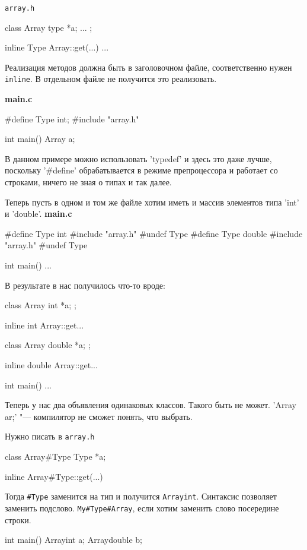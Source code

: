 \verb'array.h'
\begin{cppcode}
class Array {
    type *a;
    ...
};

inline Type Array::get(...) {  
    ...
}
\end{cppcode}

Реализация методов должна быть в заголовочном файле, соответственно нужен \verb'inline'. В отдельном файле не получится это реализовать.

\textbf{main.c}
\begin{cppcode}
#define Type int;
#include "array.h"

int main() {
    Array a;
}
\end{cppcode}

В данном примере можно использовать \cpp'typedef' и здесь это даже лучше, поскольку \cpp'#define' обрабатывается в режиме препроцессора
и работает со строками, ничего не зная о типах и так далее.

Теперь пусть в одном и том же файле хотим иметь и массив элементов типа \cpp'int' и \cpp'double'.
\textbf{main.c}
\begin{cppcode}
#define Type int
#include "array.h"
#undef Type
#define Type double
#include "array.h"
#undef Type 

int main() {
    ...
}
\end{cppcode}

В результате в нас получилось что-то вроде:
\begin{cppcode}
class Array{
    int *a;
};

inline int Array::get...

class Array{
    double *a;
};

inline double Array::get...

int main() {
    ...
}
\end{cppcode}
Теперь у нас два объявления одинаковых классов.
Такого быть не может.
\cpp'Array ar;' "--- компилятор не сможет понять, что выбрать. 

Нужно писать в \verb'array.h'
\begin{cppcode}
class Array#Type{
    Type *a;
}

inline Array#Type::get(...) {

}
\end{cppcode}

Тогда \verb'#Type' заменится на тип и получится \verb'Arrayint'. Синтаксис позволяет заменить подслово.
\verb'My#Type#Array', если хотим заменить слово посередине строки.

\begin{cppcode}
int main() {
    Arrayint a;
    Arraydouble b;
}
\end{cppcode}

